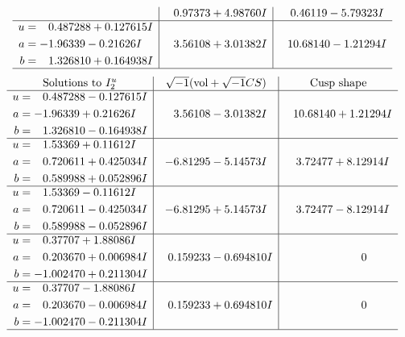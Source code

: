 \documentclass[1p]{elsarticle_modified}
\theoremstyle{definition}
\newcommand{\I}{\sqrt{-1}}
\begin{document}
$$\begin{array}{c|c|c}
 & \phantom{-}0.97373 + 4.98760 I & \phantom{-}0.46119 - 5.79323 I \\ \hline\begin{aligned}
u &= \phantom{-}0.487288 + 0.127615 I \\
a &= -1.96339 - 0.21626 I \\
b &= \phantom{-}1.326810 + 0.164938 I\end{aligned}
 & \phantom{-}3.56108 + 3.01382 I & \phantom{-}10.68140 - 1.21294 I\\
 \hline 
 \end{array}$$\newpage$$\begin{array}{c|c|c}  
\text{Solutions to }I^u_{2}& \I (\text{vol} + \sqrt{-1}CS) & \text{Cusp shape}\\
 \hline 
\begin{aligned}
u &= \phantom{-}0.487288 - 0.127615 I \\
a &= -1.96339 + 0.21626 I \\
b &= \phantom{-}1.326810 - 0.164938 I\end{aligned}
 & \phantom{-}3.56108 - 3.01382 I & \phantom{-}10.68140 + 1.21294 I \\ \hline\begin{aligned}
u &= \phantom{-}1.53369 + 0.11612 I \\
a &= \phantom{-}0.720611 + 0.425034 I \\
b &= \phantom{-}0.589988 + 0.052896 I\end{aligned}
 & -6.81295 - 5.14573 I & \phantom{-}3.72477 + 8.12914 I \\ \hline\begin{aligned}
u &= \phantom{-}1.53369 - 0.11612 I \\
a &= \phantom{-}0.720611 - 0.425034 I \\
b &= \phantom{-}0.589988 - 0.052896 I\end{aligned}
 & -6.81295 + 5.14573 I & \phantom{-}3.72477 - 8.12914 I \\ \hline\begin{aligned}
u &= \phantom{-}0.37707 + 1.88086 I \\
a &= \phantom{-}0.203670 + 0.006984 I \\
b &= -1.002470 + 0.211304 I\end{aligned}
 & \phantom{-}0.159233 - 0.694810 I & \phantom{-0.000000 } 0 \\ \hline\begin{aligned}
u &= \phantom{-}0.37707 - 1.88086 I \\
a &= \phantom{-}0.203670 - 0.006984 I \\
b &= -1.002470 - 0.211304 I\end{aligned}
 & \phantom{-}0.159233 + 0.694810 I & \phantom{-0.000000 } 0\\
 \hline 
 \end{array}$$\newpage
\end{document}
